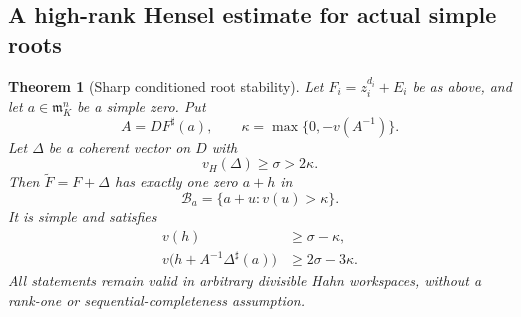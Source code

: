 \documentclass[11pt,letterpaper]{article}
\newtheorem{theorem}{Theorem}[section]
\theoremstyle{definition}
\theoremstyle{remark}
\newcommand{\mm}{\mathfrak m}
\newcommand{\sh}{^{\sharp}}
\numberwithin{equation}{section}
\begin{document}
\subsection{A high-rank Hensel estimate for actual simple roots}
\begin{theorem}[Sharp conditioned root stability]\label{thm:rootstability}
Let $F_i=z_i^{d_i}+E_i$ be as above, and let $a\in\mm_K^n$ be a simple zero. Put
\begin{equation}\label{eq:kappa}
 A=DF\sh(a),\qquad \kappa=\max\{0,-v(A^{-1})\}.
\end{equation}
Let $\Delta$ be a coherent vector on $D$ with
\begin{equation}\label{eq:threshold}
 v_H(\Delta)\ge\sigma>2\kappa.
\end{equation}
Then $\widetilde F=F+\Delta$ has exactly one zero $a+h$ in
\[
 \mathcal B_a=\{a+u:v(u)>\kappa\}.
\]
It is simple and satisfies
\begin{align}
 v(h)&\ge\sigma-\kappa,\label{eq:shiftbound}\\
 v\bigl(h+A^{-1}\Delta\sh(a)\bigr)&\ge2\sigma-3\kappa.
 \label{eq:errorbound}
\end{align}
All statements remain valid in arbitrary divisible Hahn workspaces, without a rank-one or sequential-completeness assumption.
\end{theorem}
\end{document}
